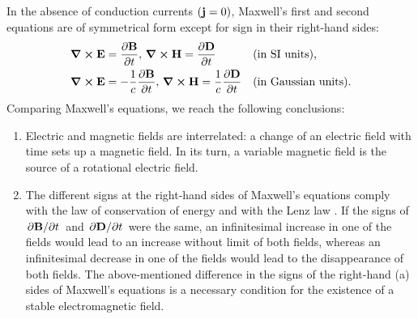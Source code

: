 \subsection{}\label{27.3.6} In the absence of conduction currents $(\vb{j} = 0)$, Maxwell's first and second equations are of symmetrical form except for sign in their right-hand sides:
\begin{align*}%
\curl \vb{E} & = \pdv{\vb{B}}{t}, \, \curl \vb{H} = \pdv{\vb{D}}{t} && \text{(in SI units),} \\
\curl \vb{E} & = -\frac{1}{c} \pdv{\vb{B}}{t}, \, \curl \vb{H} = \frac{1}{c}  \pdv{\vb{D}}{t} && \text{(in Gaussian units).}
\end{align*}
Comparing Maxwell's equations, we reach the following conclusions:
\begin{enumerate}[label=(\alph*)]
\item Electric and magnetic fields are interrelated: a change of an electric field with time sets up a magnetic field. In its turn, a variable magnetic field is the source of a rotational electric field.
\item The different signs at the right-hand sides of Maxwell's equations comply with the law of conservation of energy and with the Lenz law . If the signs of $\pdv*{\vb{B}}{t}$ and $\pdv*{\vb{D}}{t}$ were the same, an infinitesimal increase in one of the fields would lead to an increase without limit of both fields, whereas an infinitesimal decrease in one of the fields would lead to the disappearance of both fields. The above-mentioned difference in the signs of the right-hand (a) sides of Maxwell's equations is a necessary condition for the existence of a stable electromagnetic field.
\end{enumerate}

